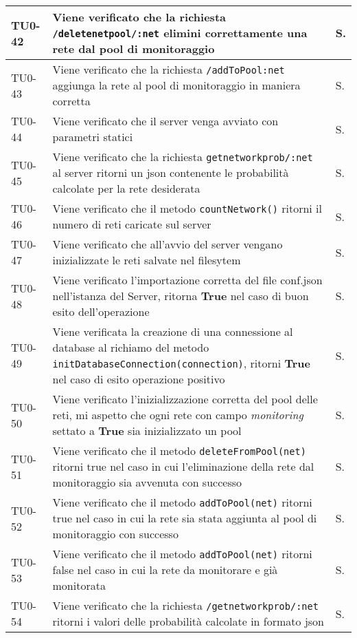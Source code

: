 \begin{longtable}{|C{.15\textwidth}|m{.66\textwidth}|C{.10\textwidth}|}
\hline 
 TU0-42 & Viene verificato che la richiesta \texttt{/deletenetpool/:net} elimini correttamente una rete dal pool di monitoraggio & S. \\ 
 \hline
{} TU0-43 & Viene verificato che la richiesta \texttt{/addToPool:net} aggiunga la rete al pool di monitoraggio in maniera corretta & S. \\ 
\hline
TU0-44 & Viene verificato che il server venga avviato con parametri statici & S. \\ 
\hline
{}TU0-45 & Viene verificato che la richiesta \texttt{getnetworkprob/:net} al server ritorni un json contenente le probabilità calcolate per la rete desiderata & S. \\ 
\hline 
TU0-46 & Viene verificato che il metodo \texttt{countNetwork()} ritorni il numero di reti caricate sul server & S. \\ 
\hline 
{}TU0-47 & Viene verificato che all'avvio del server vengano inizializzate le reti salvate nel filesytem & S. \\ 
\hline
TU0-48 & Viene verificato l'importazione corretta del file conf.json nell'istanza del Server, ritorna \textbf{True} nel caso di buon esito dell'operazione & S.\\
\hline
{}TU0-49 &  Viene verificata la creazione di una connessione al database al richiamo del metodo \texttt{initDatabaseConnection(connection)}, ritorni \textbf{True} nel caso di esito operazione positivo & S.\\ 
\hline
TU0-50 & Viene verificato l'inizializzazione corretta del pool delle reti, mi aspetto che ogni rete con campo \textit{monitoring} settato a \textbf{True} sia inizializzato un pool & S.\\
\hline
{}TU0-51 & Viene verificato che il metodo \texttt{deleteFromPool(net)} ritorni true nel caso in cui l'eliminazione della rete dal monitoraggio sia avvenuta con successo & S. \\
\hline
TU0-52 & Viene verificato che il metodo \texttt{addToPool(net)} ritorni true nel caso in cui la rete sia stata aggiunta al pool di monitoraggio con successo & S. \\ 
\hline
{}TU0-53 & Viene verificato che il metodo \texttt{addToPool(net)} ritorni false nel caso in cui la rete da monitorare e già monitorata & S. \\ 
\hline
TU0-54 & Viene verificato che la richiesta \texttt{/getnetworkprob/:net} ritorni i valori delle probabilità calcolate in formato json & S. \\ 

\end{longtable}
